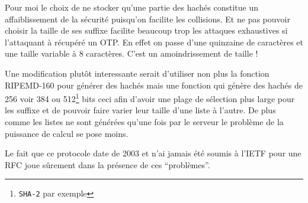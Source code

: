 \documentclass{../res/univ-projet}
\begin{document}
        Pour moi le choix de ne stocker qu'une partie des hachés constitue un affaiblissement de la sécurité puisqu'on facilite
    les collisions. Et ne pas pouvoir choisir la taille de ses suffixe facilite beaucoup trop les attaques exhaustives
    si l'attaquant à récupéré un OTP. En effet on passe d'une quinzaine de caractères et une taille variable à 8 caractères.
    C'est un amoindrissement de taille !

        Une modification plutôt interessante serait d'utiliser non plus la fonction RIPEMD-160 pour générer des hachés mais
    une fonction qui génère des hachés de 256 voir 384 ou 512\footnote{\verb?SHA-2? par exemple} bits ceci afin d'avoir une
    plage de sélection plus large pour les suffixe et de pouvoir faire varier leur taille d'une liste à l'autre.
    De plus comme les listes ne sont générées qu'une fois par le serveur le problème de la puissance de calcul se pose moins.

        Le fait que ce protocole date de 2003 et n'ai jamais été soumis à l'IETF pour une RFC joue sûrement dans la présence
    de ces ``problèmes''.
\end{document}
